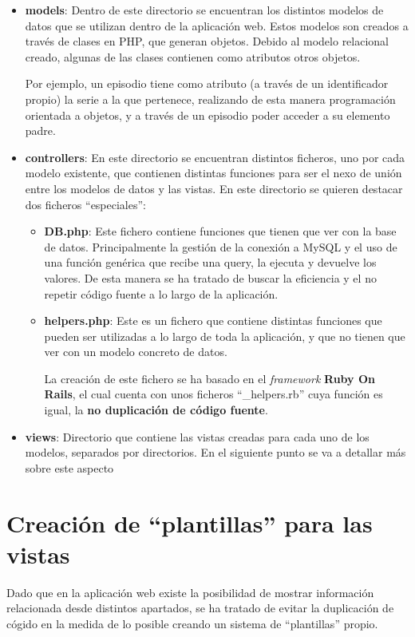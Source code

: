 \documentclass{\ClassPath/viu-tfm-template}
\begin{document}
\vspace{-1em}
\begin{itemize}
    \item \textbf{models}: Dentro de este directorio se encuentran los distintos modelos de datos que se utilizan dentro de la aplicación web. Estos modelos son creados a través de clases en PHP, que generan objetos. Debido al modelo relacional creado, algunas de las clases contienen como atributos otros objetos.

    Por ejemplo, un episodio tiene como atributo (a través de un identificador propio) la serie a la que pertenece, realizando de esta manera programación orientada a objetos, y a través de un episodio poder acceder a su elemento padre.

    \item \textbf{controllers}: En este directorio se encuentran distintos ficheros, uno por cada modelo existente, que contienen distintas funciones para ser el nexo de unión entre los modelos de datos y las vistas. En este directorio se quieren destacar dos ficheros “especiales”:
    \begin{itemize}
        \item \textbf{DB.php}: Este fichero contiene funciones que tienen que ver con la base de datos. Principalmente la gestión de la conexión a MySQL y el uso de una función genérica que recibe una query, la ejecuta y devuelve los valores. De esta manera se ha tratado de buscar la eficiencia y el no repetir código fuente a lo largo de la aplicación.

        \item \textbf{helpers.php}: Este es un fichero que contiene distintas funciones que pueden ser utilizadas a lo largo de toda la aplicación, y que no tienen que ver con un modelo concreto de datos.

        La creación de este fichero se ha basado en el \textit{framework} \textbf{Ruby On Rails}, el cual cuenta con unos ficheros “\_helpers.rb” cuya función es igual, la \textbf{no duplicación de código fuente}.
    \end{itemize}

    \item \textbf{views}: Directorio que contiene las vistas creadas para cada uno de los modelos, separados por directorios. En el siguiente punto se va a detallar más sobre este aspecto
\end{itemize}

\section{Creación de “plantillas” para las vistas}
Dado que en la aplicación web existe la posibilidad de mostrar información relacionada desde distintos apartados, se ha tratado de evitar la duplicación de cógido en la medida de lo posible creando un sistema de “plantillas” propio.
\end{document}
